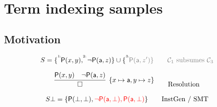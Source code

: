 
\section{Term indexing samples}
\subsection{Motivation}



\begin{example}
	\begin{gather*}
	S = \{ \TI{1}\mP(x,y), \TI{2}\lnot \mP(\ma,z)\} \cup \{\TI{3}\colG\mP(\ma,z') \}
	\tag*{\( \mcC_1 \) subsumes \( \mcC_3 \)}
	\\[0.7em]
	\infer[\{x\mapsto\ma,y\mapsto z\}]
	{\square}
	{\mP(x,y) & \lnot \mP(\ma,z)}
	\tag*{Resolution}
	\\[0.7em]
	S\bot = \{ \mP(\bot,\bot), {\colLo\lnot \mP(\ma,\bot), \mP(\ma,\bot)} \}
	\tag*{InstGen / SMT}
	\end{gather*}
\end{example}

